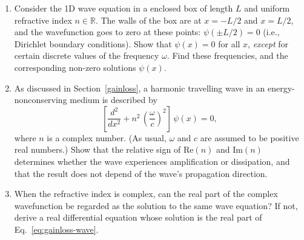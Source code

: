 \documentclass[10pt,a4paper]{article}
\begin{document}
\begin{enumerate}
\item
  Consider the 1D wave equation in a enclosed box of length $L$ and
  uniform refractive index $n\in\mathbb{R}$. The walls of the box are
  at $x = -L/2$ and $x = L/2$, and the wavefunction goes to zero at
  these points: $\psi(\pm L/2) = 0$ (i.e., Dirichlet boundary
  conditions). Show that $\psi(x) = 0$ for all $x$, \emph{except}
  for certain discrete values of the frequency $\omega$. Find these
  frequencies, and the corresponding non-zero solutions $\psi(x)$.

\item
  As discussed in Section~\ref{gainloss}, a harmonic travelling wave
  in an energy-nonconserving medium is described by
  \begin{equation}
    \left[\frac{d^2}{d x^2} + n^2\, \left(\frac{\omega}{c}\right)^2\right] \, \psi(x) = 0,
  \end{equation}
  where $n$ is a complex number. (As usual, $\omega$ and $c$ are
  assumed to be positive real numbers.) Show that the relative sign of
  $\mathrm{Re}(n)$ and $\mathrm{Im}(n)$ determines whether the wave
  experiences amplification or dissipation, and that the result does
  not depend of the wave's propagation direction.

\item
  When the refractive index is complex, can the real part of the
  complex wavefunction be regarded as the solution to the same wave
  equation? If not, derive a real differential equation whose solution
  is the real part of Eq.~\eqref{eq:gainloss-wave}.
\end{enumerate}

    
\end{document}
